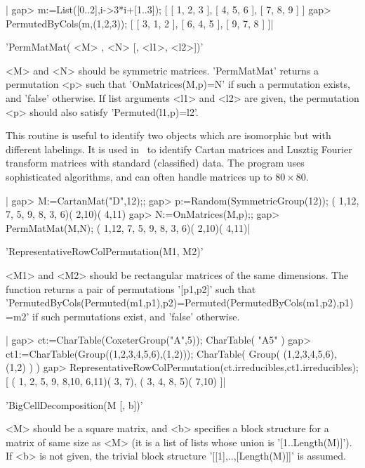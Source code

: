 |    gap> m:=List([0..2],i->3*i+[1..3]);
    [ [ 1, 2, 3 ], [ 4, 5, 6 ], [ 7, 8, 9 ] ]
    gap> PermutedByCols(m,(1,2,3));
    [ [ 3, 1, 2 ], [ 6, 4, 5 ], [ 9, 7, 8 ] ]|

%
%

'PermMatMat( <M> , <N> [, <l1>, <l2>])'

<M>  and  <N>  should  be  symmetric  matrices.  'PermMatMat'  returns a
permutation  <p>  such  that  'OnMatrices(M,p)=N'  if such a permutation
exists,  and  'false'  otherwise.  If  list  arguments <l1> and <l2> are
given, the permutation <p> should also satisfy 'Permuted(l1,p)=l2'.

This  routine is useful to identify two objects which are isomorphic but
with  different labelings.  It is  used in  \CHEVIE\ to  identify Cartan
matrices   and   Lusztig   Fourier   transform  matrices  with  standard
(classified)  data. The  program uses  sophisticated algorithms, and can
often handle matrices up to $80\times 80$.

|    gap> M:=CartanMat("D",12);;
    gap> p:=Random(SymmetricGroup(12));
    ( 1,12, 7, 5, 9, 8, 3, 6)( 2,10)( 4,11)
    gap> N:=OnMatrices(M,p);;
    gap> PermMatMat(M,N);
    ( 1,12, 7, 5, 9, 8, 3, 6)( 2,10)( 4,11)|

%
%

'RepresentativeRowColPermutation(M1, M2)'

<M1>  and <M2> should  be rectangular matrices  of the same dimensions. The
function returns a pair of permutations '[p1,p2]' such that
'PermutedByCols(Permuted(m1,p1),p2)=Permuted(PermutedByCols(m1,p2),p1)=m2'
if such permutations exist, and 'false' otherwise.

|    gap> ct:=CharTable(CoxeterGroup("A",5));
    CharTable( "A5" )
    gap> ct1:=CharTable(Group((1,2,3,4,5,6),(1,2)));
    CharTable( Group( (1,2,3,4,5,6), (1,2) ) )
    gap> RepresentativeRowColPermutation(ct.irreducibles,ct1.irreducibles);
    [ ( 1, 2, 5, 9, 8,10, 6,11)( 3, 7), ( 3, 4, 8, 5)( 7,10) ]|

%
%

'BigCellDecomposition(M [, b])'

<M>  should be a square  matrix, and <b> specifies  a block structure for a
matrix  of  same  size  as  <M>  (it  is  a  list  of  lists whose union is
'[1..Length(M)]').  If  <b>  is  not  given,  the  trivial  block structure
'[[1],..,[Length(M)]]' is assumed.


